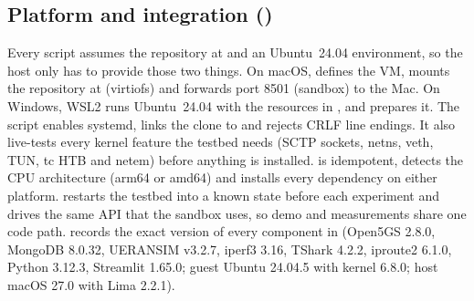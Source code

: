 \subsection{Platform and integration (\memberH)}
Every script assumes the repository at  and an Ubuntu~24.04 environment, so
the host only has to provide those two things. On macOS,  defines the
VM, mounts the repository at  (virtiofs) and forwards port 8501 (sandbox) to the
Mac. On Windows, WSL2 runs Ubuntu~24.04 with the resources in , and
 prepares it. The script enables systemd, links the clone to
 and rejects CRLF line endings. It also live-tests every kernel feature the
testbed needs (SCTP sockets, netns, veth, TUN, tc HTB and netem) before anything is
installed.  is idempotent, detects the CPU architecture (arm64 or
amd64) and installs every dependency on either platform.  restarts the testbed into a known
state before each experiment and drives the same  API that the sandbox uses,
so demo and measurements share one code path.  records the exact version of every
component in  (Open5GS 2.8.0, MongoDB 8.0.32, UERANSIM v3.2.7,
iperf3 3.16, TShark 4.2.2, iproute2 6.1.0, Python 3.12.3, Streamlit 1.65.0; guest Ubuntu
24.04.5 with kernel 6.8.0; host macOS 27.0 with Lima 2.2.1).
